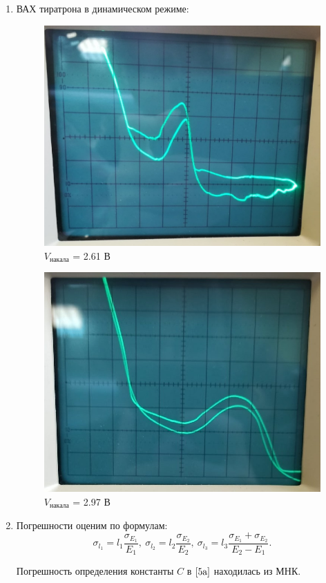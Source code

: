\documentclass[a4paper, 12pt]{article}%
\begin{document}
\begin{enumerate}
\item ВАХ тиратрона в динамическом режиме:

\begin{figure}[!h]
\includegraphics[scale=0.25]{dynam_61.jpg}
\centering
\caption{$V_{\text{накала}}$ = 2.61 В}
\label{graph5}
\end{figure}

\begin{figure}[!h]
\includegraphics[scale=0.4]{dynam_97.jpg}
\centering
\caption{$V_{\text{накала}}$ = 2.97 В}
\label{graph6}
\end{figure}


\item Погрешности оценим по формулам:
		\begin{equation*}
			\sigma_{l_1} = l_1 \frac{\sigma_{E_1}}{E_1}, \ \sigma_{l_2} = l_2 \frac{\sigma_{E_2}}{E_2}, \ \sigma_{l_3} = l_3 \frac{\sigma_{E_1}+\sigma_{E_2}}{E_2-E_1}.
		\end{equation*}

	Погрешность определения константы $C$ в $\ref{5a}$ находилась из МНК.

\end{enumerate}
\end{document}
